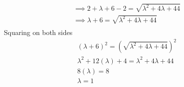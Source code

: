 \documentclass[10pt]{article}
\providecommand{\brak}[1]{\ensuremath{\left(#1\right)}}
\begin{document}
\begin{enumerate}
\begin{align}
\implies 2+\lambda+6-2 = {\sqrt{\lambda^2+4\lambda+44}} \\
\implies \lambda+6 = {\sqrt{\lambda^2+4\lambda+44}}\\
\end{align}
Squaring on both sides
\begin{align}
    \brak{\lambda+6}^2 = \brak{{\sqrt{\lambda^2+4\lambda+44}}}^2\\
    \lambda^2+12\brak{\lambda}+4 = \lambda^2+4\lambda+44\\
    8\brak{\lambda} = 8\\
    \lambda = 1
\end{align}
\end{enumerate}
\end{document}
